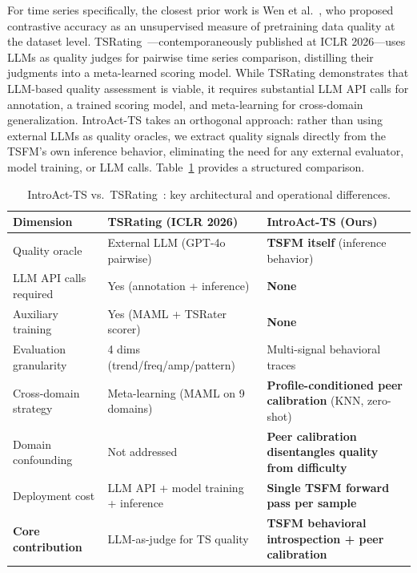 \documentclass{article}
\begin{document}
For time series specifically, the closest prior work is Wen et al.~\citep{wen2024measuring}, who proposed contrastive accuracy as an unsupervised measure of pretraining data quality at the dataset level. TSRating~\citep{chen2026tsrating}---contemporaneously published at ICLR 2026---uses LLMs as quality judges for pairwise time series comparison, distilling their judgments into a meta-learned scoring model. While TSRating demonstrates that LLM-based quality assessment is viable, it requires substantial LLM API calls for annotation, a trained scoring model, and meta-learning for cross-domain generalization. IntroAct-TS takes an orthogonal approach: rather than using external LLMs as quality oracles, we extract quality signals directly from the TSFM's own inference behavior, eliminating the need for any external evaluator, model training, or LLM calls. Table~\ref{tab:tsrating_vs} provides a structured comparison.

\begin{table}[t]
\centering
\caption{IntroAct-TS vs.\ TSRating~\citep{chen2026tsrating}: key architectural and operational differences.}
\label{tab:tsrating_vs}
\begin{tabular}{p{3.5cm}p{5cm}p{5cm}}
\toprule
\textbf{Dimension} & \textbf{TSRating (ICLR 2026)} & \textbf{IntroAct-TS (Ours)} \\
\midrule
Quality oracle & External LLM (GPT-4o pairwise) & \textbf{TSFM itself} (inference behavior) \\
LLM API calls required & Yes (annotation + inference) & \textbf{None} \\
Auxiliary training & Yes (MAML + TSRater scorer) & \textbf{None} \\
Evaluation granularity & 4 dims (trend/freq/amp/pattern) & Multi-signal behavioral traces \\
Cross-domain strategy & Meta-learning (MAML on 9 domains) & \textbf{Profile-conditioned peer calibration} (KNN, zero-shot) \\
Domain confounding & Not addressed & \textbf{Peer calibration disentangles quality from difficulty} \\
Deployment cost & LLM API + model training + inference & \textbf{Single TSFM forward pass per sample} \\
\midrule
\textbf{Core contribution} & LLM-as-judge for TS quality & \textbf{TSFM behavioral introspection + peer calibration} \\
\bottomrule
\end{tabular}
\end{table}
\end{document}
